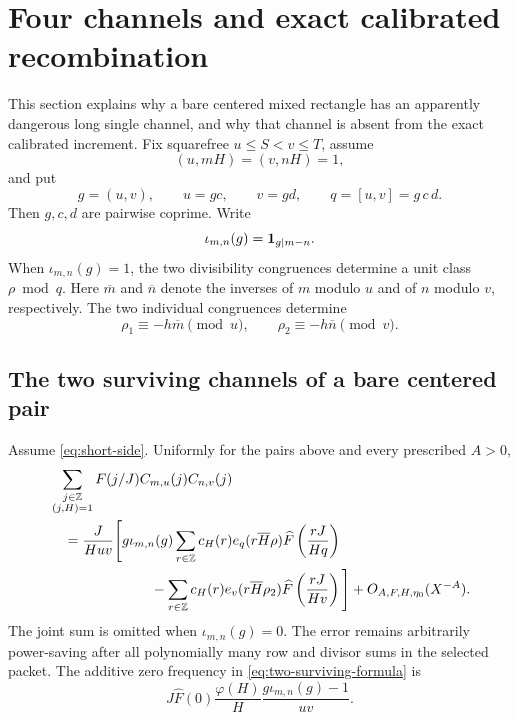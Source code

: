 \section{Four channels and exact calibrated recombination}
\label{sec:asymmetric-four-channel}

This section explains why a bare centered mixed rectangle has an
apparently dangerous long single channel, and why that channel is
absent from the exact calibrated increment.  Fix squarefree
\(u\le S<v\le T\), assume
\begin{equation}
 (u,mH)=(v,nH)=1,
 \label{eq:pair-primitivity}
\end{equation}
and put
\begin{equation}
 g=(u,v),\qquad u=gc,\qquad v=gd,\qquad
 q=[u,v]=g\,c\,d.
 \label{eq:gcdq}
\end{equation}
Then \(g,c,d\) are pairwise coprime.  Write
\begin{equation}
 \iota_{m,n}(g)=\mathbf 1_{g\mid m-n}.
 \label{eq:compatibility-indicator}
\end{equation}
When \(\iota_{m,n}(g)=1\), the two divisibility congruences determine
a unit class \(\rho\bmod q\).  Here \(\overline m\) and \(\overline n\)
denote the inverses of \(m\) modulo \(u\) and of \(n\) modulo \(v\),
respectively.  The two individual congruences determine
\begin{equation}
 \rho_1\equiv-h\overline m\pmod u,
 \qquad
 \rho_2\equiv-h\overline n\pmod v.
 \label{eq:rho12}
\end{equation}

\subsection{The two surviving channels of a bare centered pair}

\begin{theorem}
\label{thm:two-surviving-channels}
Assume \eqref{eq:short-side}.  Uniformly for the pairs above and every
prescribed \(A>0\),
\begin{align}
 &\sum_{\substack{j\in\mathbb Z\\(j,H)=1}}
 F(j/J)C_{m,u}(j)C_{n,v}(j)
 \notag\\
 &\quad=
 \frac{J}{Huv}\Bigg[
 g\iota_{m,n}(g)
 \sum_{r\in\mathbb Z}
 c_H(r)e_q(r\overline H\rho)
 \widehat F\left(\frac{rJ}{Hq}\right)
 \notag\\
 &\hspace{7.2em}
 -\sum_{r\in\mathbb Z}
 c_H(r)e_v(r\overline H\rho_2)
 \widehat F\left(\frac{rJ}{Hv}\right)
 \Bigg]
 +O_{A,F,H,\eta_0}(X^{-A}).
 \label{eq:two-surviving-formula}
\end{align}
The joint sum is omitted when \(\iota_{m,n}(g)=0\).  The error remains
arbitrarily power-saving after all polynomially many row and divisor
sums in the selected packet.  The additive zero frequency in
\eqref{eq:two-surviving-formula} is
\begin{equation}
 J\widehat F(0)\frac{\varphi(H)}H
 \frac{g\iota_{m,n}(g)-1}{uv}.
 \label{eq:pair-zero-mode}
\end{equation}
\end{theorem}

